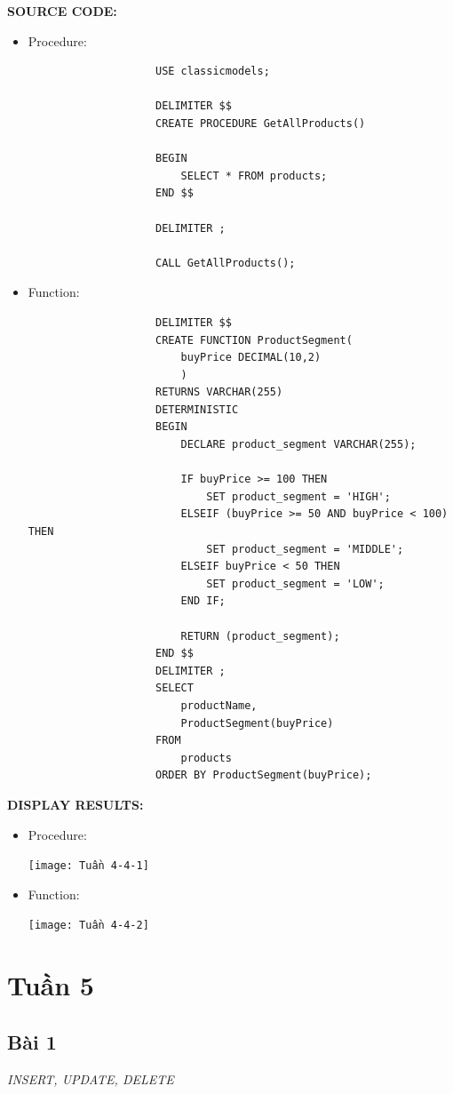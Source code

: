 \documentclass[12pt,a4paper]{report}
\begin{document}
	{\bf SOURCE CODE:}
		\begin{itemize}
			\item Procedure:
				\begin{lstlisting}
					USE classicmodels;

					DELIMITER $$
					CREATE PROCEDURE GetAllProducts()

					BEGIN 
						SELECT * FROM products;
					END $$

					DELIMITER ;

					CALL GetAllProducts();
				\end{lstlisting}
			\item Function:
				\begin{lstlisting}
					DELIMITER $$
					CREATE FUNCTION ProductSegment(
						buyPrice DECIMAL(10,2)
						)
					RETURNS VARCHAR(255)
					DETERMINISTIC
					BEGIN 
						DECLARE product_segment VARCHAR(255);
    
						IF buyPrice >= 100 THEN
							SET product_segment = 'HIGH';
						ELSEIF (buyPrice >= 50 AND buyPrice < 100) THEN
							SET product_segment = 'MIDDLE';
						ELSEIF buyPrice < 50 THEN
							SET product_segment = 'LOW';
						END IF;
    
						RETURN (product_segment);
					END $$
					DELIMITER ;
					SELECT
						productName,
   						ProductSegment(buyPrice)
					FROM
						products
					ORDER BY ProductSegment(buyPrice);
				\end{lstlisting}
		\end{itemize}
	
	{\bf DISPLAY RESULTS:}
		\begin{itemize}
			\item Procedure:
				\begin{center}
					\texttt{[image: Tuần 4-4-1]}
				\end{center}
			\item Function: 
				\begin{flushleft}
					\texttt{[image: Tuần 4-4-2]}
				\end{flushleft}
		\end{itemize}
\newpage
\section{Tuần 5}
\subsection{Bài 1}
	\begin{center}
		{\it INSERT, UPDATE, DELETE}
	\end{center}
	
\end{document}
